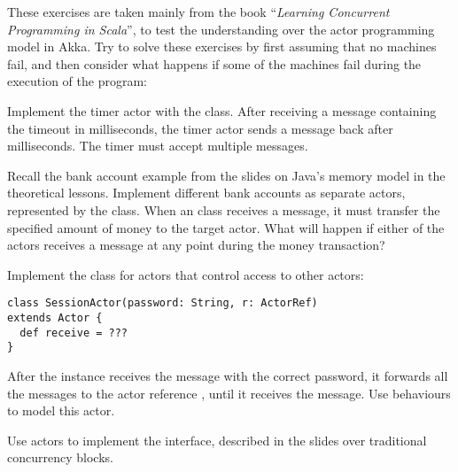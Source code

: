 \documentclass[11pt]{article}
\begin{document}
\myHeader

These exercises are taken mainly from the book ``\emph{Learning Concurrent Programming in Scala}'', to test the understanding over the actor programming model in Akka.
Try to solve these exercises by first assuming that no machines fail, and then consider what happens if some of the machines fail during the execution of the program:

\begin{myExercise}
Implement the timer actor with the  class. After receiving a  message containing the  timeout in milliseconds, the timer actor sends a  message back after  milliseconds. The timer must accept multiple  messages.
\end{myExercise}

\begin{myExercise}
Recall the bank account example from the slides on Java's memory model in the theoretical lessons. Implement different bank accounts as separate actors, represented by the  class. When an  class receives a  message, it must transfer the specified amount of money to the target actor. What will happen if either of the actors receives a  message at any point during the money transaction?
\end{myExercise}

\begin{myExercise}
Implement the  class for actors that control access to other actors:
\begin{lstlisting}
class SessionActor(password: String, r: ActorRef)
extends Actor {
  def receive = ???
}
\end{lstlisting}
After the  instance receives the  message with the correct password, it forwards all the messages to the actor reference , until it receives the  message. Use behaviours to model this actor.
\end{myExercise}

\begin{myExercise}
Use actors to implement the  interface, described in the slides over traditional concurrency blocks.
\end{myExercise}
\end{document}
